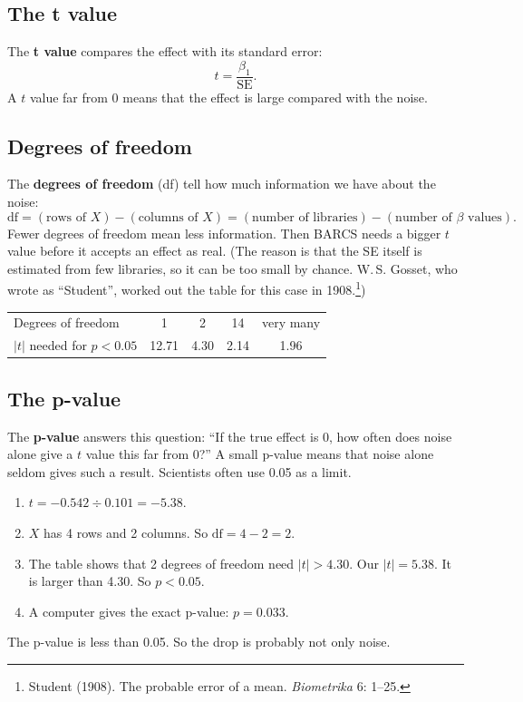 \subsection{The t value}

The \textbf{t value} compares the effect with its standard error:
\[
t = \frac{\beta_1}{\text{SE}}.
\]
A $t$ value far from 0 means that the effect is large compared with the
noise.

\subsection{Degrees of freedom}

The \textbf{degrees of freedom} (df) tell how much information we have
about the noise:
\[
\text{df} = (\text{rows of } X) - (\text{columns of } X)
 = (\text{number of libraries}) - (\text{number of } \beta \text{ values}).
\]
Fewer degrees of freedom mean less information. Then BARCS needs a bigger
$t$ value before it accepts an effect as real. (The reason is that the SE
itself is estimated from few libraries, so it can be too small by chance.
W.\,S. Gosset, who wrote as ``Student'', worked out the table for this case
in 1908.\footnote{Student (1908). The probable error of a mean.
\emph{Biometrika} 6: 1--25.})

\begin{center}
\begin{tabular}{lcccc}
\toprule
Degrees of freedom & 1 & 2 & 14 & very many\\
$|t|$ needed for $p < 0.05$ & 12.71 & 4.30 & 2.14 & 1.96\\
\bottomrule
\end{tabular}
\end{center}

\subsection{The p-value}

The \textbf{p-value} answers this question: ``If the true effect is 0, how
often does noise alone give a $t$ value this far from 0?'' A small p-value
means that noise alone seldom gives such a result. Scientists often use 0.05
as a limit.

\begin{worked}
\begin{enumerate}[leftmargin=1.4em]
\item $t = -0.542 \div 0.101 = -5.38$.
\item $X$ has 4 rows and 2 columns. So $\text{df} = 4 - 2 = 2$.
\item The table shows that 2 degrees of freedom need $|t| > 4.30$. Our
  $|t| = 5.38$. It is larger than 4.30. So $p < 0.05$.
\item A computer gives the exact p-value: $p = 0.033$.
\end{enumerate}
The p-value is less than 0.05. So the drop is probably not only noise.
\end{worked}

